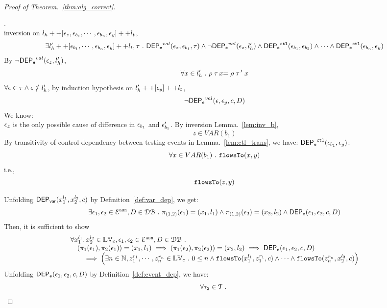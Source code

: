 \begin{proof}[Proof of Theorem.~\ref{thm:alg_correct}]
\begin{case}
%
\begin{subcase}.
\\
inversion on  $l_h ++ {[\mathtt{\epsilon}_z,  \mathtt{\epsilon}_{b_1}, \cdots, \mathtt{\epsilon}_{b_n},\mathtt{\epsilon}_y]} ++ l_t$, 
\[
  \exists l_{h}' ++ [ \mathtt{\epsilon}_{b_1}, \cdots, \mathtt{\epsilon}_{b_n}, \mathtt{\epsilon}_y] ++ l_t, \mathtt{\tau} ~.~
  \mathsf{DEP_{\mathtt{e}}}^{val}(\mathtt{\epsilon}_z, \mathtt{\epsilon}_{b_1}, \mathtt{\tau})
  \land 
  \neg \mathsf{DEP_{\mathtt{e}}}^{val} (\mathtt{\epsilon}_z, l_h')
  \land 
  \mathsf{DEP_{\mathtt{e}}}^{\mathtt{{ctl}}} (\mathtt{\epsilon}_{b_1}, \mathtt{\epsilon}_{b_2})
  \land 
  \cdots
  \land 
  \mathsf{DEP_{\mathtt{e}}}^{\mathtt{{ctl}}} (\mathtt{\epsilon}_{b_n}, \mathtt{\epsilon}_y)
\]
%
By $\neg \mathsf{DEP_{\mathtt{e}}}^{val} (\mathtt{\epsilon}_z, l_h')$, 
\[
  \forall x \in l_h' ~.~
  \rho \mathrel{ {\mathtt{\tau}} \, {x} } = \rho \mathrel{ {\mathtt{\tau}} \, {'} } x
\]
%
$\forall \mathtt{\epsilon} \in \mathtt{\tau} \land \mathtt{\epsilon} \notin l_h'$, by induction hypothesis on $l_{h}' ++ [\mathtt{\epsilon}_y] ++ l_t$, 
\[
  \neg \mathsf{DEP_{\mathtt{e}}}^{val} (\mathtt{\epsilon}, \mathtt{\epsilon}_y, c, D)
\]
%
We know:
\\
%
$\mathtt{\epsilon}_z$ is the only possible cause of difference in $\mathtt{\epsilon}_{b_1}$ and $\mathtt{\epsilon}_{b_1}'$.
%
By inversion Lemma.~\ref{lem:inv_b}, 
\[
  z \in VAR(b_1)
\]
%
%
By transitivity of control dependency between testing events in Lemma.~\ref{lem:ctl_trans},
we have:
 $ \mathsf{DEP_{\mathtt{e}}}^{\mathtt{{ctl}}} (\mathtt{\epsilon}_{b_1}, \mathtt{\epsilon}_y)$:
\[
  \forall x \in VAR(b_1) ~.~ \mathtt{flowsTo}(x, y)
\]
i.e.,
\[
  \mathtt{flowsTo}(z, y)
\]
%
\end{subcase}
%
\end{case}
%
%
Unfolding $\mathsf{DEP_{var}}({x}_1^{l_1}, {x}_2^{l_2}, {c})$ by Definition~\ref{def:var_dep},
we get:
\[
\exists \mathtt{\epsilon}_1, \mathtt{\epsilon}_2 \in \mathcal{E}^{\mathtt{{asn}}}, D \in \mathcal{DB} ~.~
\pi_{(1,2)}{(\mathtt{\epsilon}_1)} = ({x}_1, l_1)
\land
\pi_{(1,2)}{(\mathtt{\epsilon}_2)} = ({x}_2, l_2)
\land 
\mathsf{DEP_{\mathtt{e}}}(\mathtt{\epsilon}_1, \mathtt{\epsilon}_2, c, D)
\]
%
Then, it is sufficient to show
%
\[
\begin{array}{l}
\forall {x}_1^{l_1}, {x}_2^{l_2} \in \mathbb{LV}_{{c}},
 \mathtt{\epsilon}_1, \mathtt{\epsilon}_2 \in \mathcal{E}^{\mathtt{{asn}}}, D \in \mathcal{DB} ~.~
 \\ \quad
(\pi_{1}{(\mathtt{\epsilon}_1)}, \pi_{2}{(\mathtt{\epsilon}_1)}) = ({x}_1, l_1)
\implies
(\pi_{1}{(\mathtt{\epsilon}_2)}, \pi_{2}{(\mathtt{\epsilon}_2)}) = ({x}_2, l_2)
\implies 
\mathsf{DEP_{\mathtt{e}}}(\mathtt{\epsilon}_1, \mathtt{\epsilon}_2, c, D)
 \\ \qquad \implies
   \Big(\exists  n \in \mathbb{N},z_1^{r_1}, \cdots, z_n^{r_n} \in \mathbb{LV}_{{c}} ~.~ 0 \leq n
 \land \mathtt{flowsTo}(x_1^{l_1}, z_1^{r_1}, c) \land \cdots \land \mathtt{flowsTo}(z_n^{r_n}, {x}_2^{l_2}, c) \Big)
\end{array}
\]
%
%
%
%
%
Unfolding $\mathsf{DEP_{\mathtt{e}}}(\mathtt{\epsilon}_1, \mathtt{\epsilon}_2, c, D)$ by Definition~\ref{def:event_dep}, we have:
\[
\forall \mathtt{\tau}_2 \in \mathcal{T} ~.~
\]
\end{proof}
